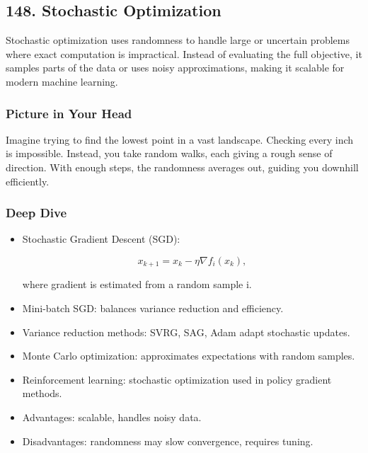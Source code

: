 \documentclass[
  letterpaper,
  DIV=11,
  numbers=noendperiod]{scrreprt}
\begin{document}
\subsection{148. Stochastic Optimization}\label{stochastic-optimization}

Stochastic optimization uses randomness to handle large or uncertain
problems where exact computation is impractical. Instead of evaluating
the full objective, it samples parts of the data or uses noisy
approximations, making it scalable for modern machine learning.

\subsubsection{Picture in Your Head}\label{picture-in-your-head-147}

Imagine trying to find the lowest point in a vast landscape. Checking
every inch is impossible. Instead, you take random walks, each giving a
rough sense of direction. With enough steps, the randomness averages
out, guiding you downhill efficiently.

\subsubsection{Deep Dive}\label{deep-dive-147}

\begin{itemize}
\item
  Stochastic Gradient Descent (SGD):

  \[
  x_{k+1} = x_k - η \nabla f_i(x_k),
  \]

  where gradient is estimated from a random sample i.
\item
  Mini-batch SGD: balances variance reduction and efficiency.
\item
  Variance reduction methods: SVRG, SAG, Adam adapt stochastic updates.
\item
  Monte Carlo optimization: approximates expectations with random
  samples.
\item
  Reinforcement learning: stochastic optimization used in policy
  gradient methods.
\item
  Advantages: scalable, handles noisy data.
\item
  Disadvantages: randomness may slow convergence, requires tuning.
\end{itemize}
\end{document}
